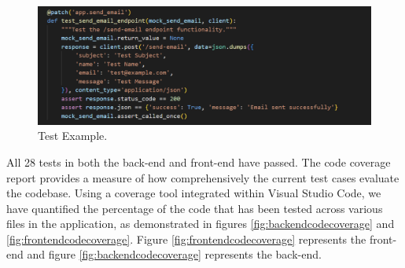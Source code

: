\documentclass{l4proj}
\begin{document}
\begin{figure}[h!]
  \centering
  \begin{adjustbox}{center,max height=0.2\textheight, max width=\linewidth}
    \includegraphics{images/testexample.png}
  \end{adjustbox}
  \caption{Test Example.}
  \label{Test Example.}
\end{figure}


All 28 tests in both the back-end and front-end have passed. The code coverage report provides a measure of how comprehensively the current test cases evaluate the codebase. Using a coverage tool integrated within Visual Studio Code, we have quantified the percentage of the code that has been tested across various files in the application, as demonstrated in figures \ref{fig:backendcodecoverage} and \ref{fig:frontendcodecoverage}. Figure \ref{fig:frontendcodecoverage} represents the front-end and figure \ref{fig:backendcodecoverage} represents the back-end.
\end{document}
